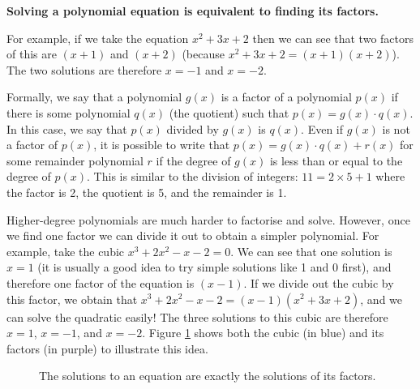 \documentclass[a4paper,10pt,titlepage]{article}
\theoremstyle{definition}
\begin{document}
\begin{center}
\textbf{Solving a polynomial equation is equivalent to finding its factors.}
\end{center}

For example, if we take the equation $ x^2 + 3x + 2 $ then we can see that two factors of this are $ (x+1) $ and
$ (x+2) $ (because $ x^2 + 3x + 2 = (x+1)(x+2) $). The two solutions are therefore $ x = -1 $
and $ x = -2 $.

Formally, we say that a polynomial $ g(x) $ is a factor of a polynomial $ p(x) $ if there is some polynomial
$ q(x) $ (the quotient) such that $ p(x) = g(x) \cdot q(x) $. In this case, we say that $ p(x) $
divided by $ g(x) $ is $ q(x) $. Even if $ g(x) $ is not a factor of $ p(x) $, it is possible to
write that $ p(x) = g(x) \cdot q(x) + r(x) $ for some remainder polynomial $ r $ if the degree of
$ g(x) $ is less than or equal to the degree of $ p(x) $. This is similar to the division of
integers: $ 11 = 2 \times 5 + 1 $ where the factor is 2, the quotient is 5, and the remainder is 1.

Higher-degree polynomials are much harder to factorise and solve. However,
once we find one factor we can divide it out to obtain a simpler polynomial. For example,
take the cubic $ x^3 + 2x^2 - x - 2 = 0$. We can see that one solution is $ x = 1 $ (it
is usually a good idea to try simple solutions like 1 and 0 first), and therefore one
factor of the equation is $ (x-1) $. If we divide out the cubic by this factor, we obtain
that $ x^3 + 2x^2 - x - 2 = (x-1)(x^2+3x+2) $, and we can solve the quadratic easily! The
three solutions to this cubic are therefore $ x = 1 $, $ x = -1 $, and $ x = -2 $. Figure \ref{fig:factgraph}
shows both the cubic (in blue) and its factors (in purple) to illustrate this idea.

\begin{figure}
  \centering
  \caption{The solutions to an equation are exactly the solutions of its factors.\label{fig:factgraph}}
\end{figure}
\end{document}
